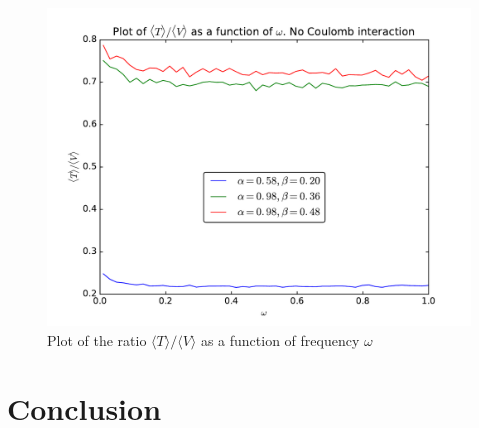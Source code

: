 \documentclass[12pt]{article}
\begin{document}
\begin{figure}[h]
\centering
\includegraphics[width=\linewidth]{Plots/Virial_Plot_NoCoulombInt.pdf}
\caption{Plot of the ratio $\langle T \rangle / \langle V \rangle$ as a function of frequency $\omega$}
\label{fig:Virial_NoCoulomb}
\end{figure}


\section{Conclusion}\label{section:conclusion}

\FloatBarrier
\end{document}
